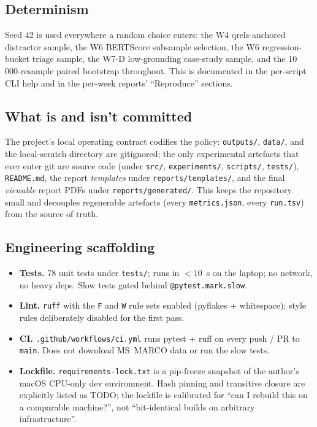 \documentclass[11pt,a4paper]{article}
\newcommand{\msmarco}{MS~MARCO}
\begin{document}
\subsection{Determinism}

Seed 42 is used everywhere a random choice enters: the W4
qrels-anchored distractor sample, the W6 BERTScore subsample
selection, the W6 regression-bucket triage sample, the W7-D
low-grounding case-study sample, and the 10\,000-resample paired
bootstrap throughout.  This is documented in the per-script CLI
help and in the per-week reports' ``Reproduce'' sections.

\subsection{What is and isn't committed}

The project's local operating contract codifies the policy:
\texttt{outputs/}, \texttt{data/}, and the local-scratch directory
are gitignored; the only experimental artefacts that ever enter git
are source code (under \texttt{src/}, \texttt{experiments/},
\texttt{scripts/}, \texttt{tests/}), \texttt{README.md}, the report
\emph{templates} under \texttt{reports/templates/}, and the final
\emph{viewable} report PDFs under \texttt{reports/generated/}.
This keeps the repository small and decouples regenerable
artefacts (every \texttt{metrics.json}, every \texttt{run.tsv})
from the source of truth.

\subsection{Engineering scaffolding}

\begin{itemize}
  \item \textbf{Tests.}  78 unit tests under \texttt{tests/}; runs
        in $<\!10$~s on the laptop; no network, no heavy deps.
        Slow tests gated behind \texttt{@pytest.mark.slow}.
  \item \textbf{Lint.}  \texttt{ruff} with the \texttt{F} and
        \texttt{W} rule sets enabled (pyflakes + whitespace); style
        rules deliberately disabled for the first pass.
  \item \textbf{CI.}  \texttt{.github/workflows/ci.yml} runs pytest
        + ruff on every push / PR to \texttt{main}.  Does not
        download \msmarco{} data or run the slow tests.
  \item \textbf{Lockfile.}  \texttt{requirements-lock.txt} is a
        pip-freeze snapshot of the author's macOS CPU-only dev
        environment.  Hash pinning and transitive closure are
        explicitly listed as TODO; the lockfile is calibrated for
        ``can I rebuild this on a comparable machine?'', not
        ``bit-identical builds on arbitrary infrastructure''.
\end{itemize}
\end{document}
